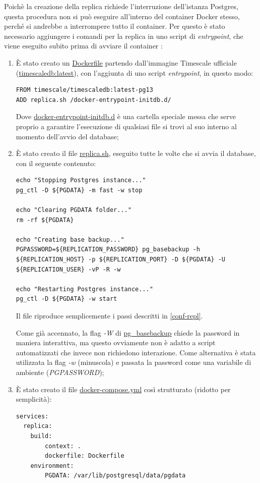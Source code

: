 Poichè la creazione della replica richiede l'interruzione dell'istanza Postgres, questa procedura non si può eseguire all'interno del container Docker stesso, perché si andrebbe a interrompere tutto il container.
Per questo è stato necessario aggiungere i comandi per la replica in uno script di \textit{entrypoint}, che viene eseguito subito prima di avviare il container \cite{dockerfile}:
\begin{enumerate}
  \item È stato creato un \url{Dockerfile} partendo dall'immagine Timescale ufficiale (\url{timescaledb:latest}), con l'aggiunta di uno script \textit{entrypoint}, in questo modo:
  \vspace{1mm}
  \begin{lstlisting}[]
FROM timescale/timescaledb:latest-pg13
ADD replica.sh /docker-entrypoint-initdb.d/
\end{lstlisting}
Dove \url{docker-entrypoint-initdb.d} è una cartella speciale messa che serve proprio a garantire l'esecuzione di qualsiasi file si trovi al suo interno al momento dell'avvio del database;
  \item È stato creato il file \url{replica.sh}, eseguito tutte le volte che si avvia il database, con il seguente contenuto:
  \vspace{1mm}
  \begin{lstlisting}[]
echo "Stopping Postgres instance..." 
pg_ctl -D ${PGDATA} -m fast -w stop

echo "Clearing PGDATA folder..." 
rm -rf ${PGDATA}

echo "Creating base backup..." 
PGPASSWORD=${REPLICATION_PASSWORD} pg_basebackup -h ${REPLICATION_HOST} -p ${REPLICATION_PORT} -D ${PGDATA} -U ${REPLICATION_USER} -vP -R -w

echo "Restarting Postgres instance..." 
pg_ctl -D ${PGDATA} -w start
\end{lstlisting}
Il file riproduce semplicemente i passi descritti in \ref{conf-repl}.

Come già accennato, la flag \textit{-W} di \url{pg\_basebackup} chiede la password in maniera interattiva, ma questo ovviamente non è adatto a script automatizzati che invece non richiedono interazione. Come alternativa è stata utilizzata la flag \textit{-w} (minuscola) e passata la password come una variabile di ambiente (\textit{PGPASSWORD});
\item È stato creato il file \url{docker-compose.yml} così strutturato (ridotto per semplicità):
\vspace{1mm}
  \begin{lstlisting}[]
services:
  replica:
    build:
        context: .
        dockerfile: Dockerfile
    environment:
        PGDATA: /var/lib/postgresql/data/pgdata


\end{lstlisting}
\end{enumerate}
